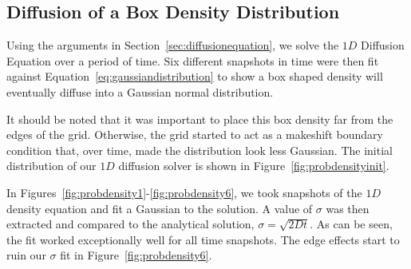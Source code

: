 \documentclass[12pt]{article}
\begin{document}


\subsection{Diffusion of a Box Density Distribution}
\label{sec:diffusion-boxdensity}
Using the arguments in Section~\ref{sec:diffusionequation}, we solve the $1D$ Diffusion Equation over a period of time. Six different snapshots in time were then fit against Equation~\ref{eq:gaussiandistribution} to show a box shaped density will eventually diffuse into a Gaussian normal distribution.

It should be noted that it was important to place this box density far from the edges of the grid. Otherwise, the grid started to act as a makeshift boundary condition that, over time, made the distribution look less Gaussian. The initial distribution of our $1D$ diffusion solver is shown in Figure~\ref{fig:probdensityinit}.

In Figures~\ref{fig:probdensity1}-\ref{fig:probdensity6}, we took snapshots of the $1D$ density equation and fit a Gaussian to the solution. A value of $\sigma$ was then extracted and compared to the analytical solution, $\sigma=\sqrt{2Dt}$. As can be seen, the fit worked exceptionally well for all time snapshots. The edge effects start to ruin our $\sigma$ fit in Figure~\ref{fig:probdensity6}.
\end{document}

